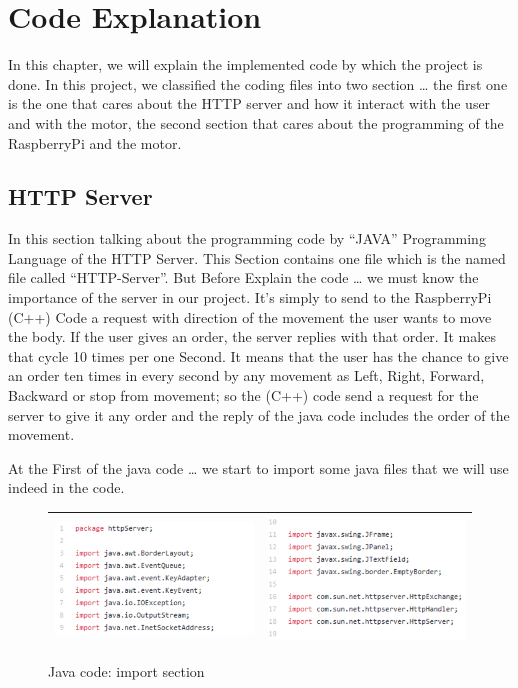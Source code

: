 \large
\section{Code Explanation}

In this chapter, we will explain the implemented code by which the project is done. In this project, we classified the coding files into two section … the first one is the one that cares about the HTTP server and how it interact with the user and with the motor, the second section that cares about the programming of the RaspberryPi and the motor.


\subsection{HTTP Server}

In this section talking about the programming code by “JAVA” Programming Language of the HTTP Server. This Section contains one file which is the named file called “HTTP-Server”. But Before Explain the code … we must know the importance of the server in our project. It’s simply to send to the RaspberryPi (C++) Code a request with direction of the movement the user wants to move the body. If the user gives an order, the server replies with that order. It makes that cycle 10 times per one Second. It means that the user has the chance to give an order ten times in every second by any movement as Left, Right, Forward, Backward or stop from movement; so the (C++) code send a request for the server to give it any order and the reply of the java code includes the order of the movement.


\newpage
At the First of the java code … we start to import some java files that we will use indeed in the code.

\begin{figure}[h]
    \centering
\begin{tabular}{|c|c|}
    \hline
    \includegraphics[width=.6\textwidth]{figures/42.1.png} & \includegraphics[width=.6\textwidth]{figures/42.2.png}\\
    \hline
\end{tabular}
    \caption{Java code: import section}
    \label{fig:my_label}
\end{figure}


